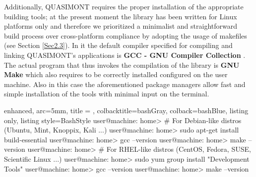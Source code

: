 \documentclass[a4paper, twosided]{book}
\begin{document}
\noindent
Additionally, QUASIMONT requires the proper installation of the appropriate building tools; at the present moment the library has been written for Linux platforms only and therefore we prioritized a minimalist and straightforward build process over cross-platform compliance by adopting the usage of \colorbox{poliGrayBlue}{makefile}s (see Section \ref{Sec2.3}). In it the default compiler specified for compiling and linking QUASIMONT's applications is \color{poliDarkBlue} \textbf{GCC - GNU Compiler Collection} \color{black} \cite{gcc}. The actual program that thus invokes the compilation of the library is \color{poliDarkBlue} \textbf{GNU Make} \color{black} \cite{make} which also requires to be correctly installed configured on the user machine. Also in this case the aforementioned package managers allow fast and simple installation of the tools with minimal input on the terminal.

\vspace{0.5cm}
\begin{tcblisting}{enhanced,
                   arc=5mm,
                   title = \color{black}{\large \ttfamily Installation of building tools},
                   colbacktitle=bashGray,
                   colback=bashBlue,
                   listing only,
                   listing style=BashStyle}
user@machine: home> # For Debian-like distros (Ubuntu, Mint, Knoppix, Kali ...)
user@machine: home> sudo apt-get install build-essential
user@machine: home> gcc --version
user@machine: home> make --version
user@machine: home> # For RHEL-like distros (CentOS, Fedora, SUSE, Scientific Linux ...)
user@machine: home> sudo yum group install "Development Tools"
user@machine: home> gcc --version
user@machine: home> make --version
\end{tcblisting}
\vspace{0.5cm}
\end{document}

